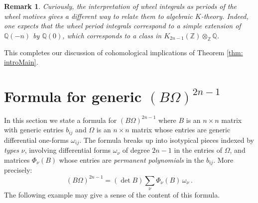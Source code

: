 \documentclass[10pt]{amsart}
\newcommand{\QQ}{{\mathbb Q}}
\newcommand{\ZZ}{{\mathbb Z}}
\theoremstyle{plain}
\newtheorem{remark}[thm]{Remark}
\newcommand{\0}{\color{blue}{\mathsf{0}}}
\begin{document}
\begin{remark}
Curiously, the  interpretation of wheel integrals as periods of the wheel motives gives a different  way to relate them to algebraic  $K$-theory. Indeed, one expects that the wheel period integrals correspond to a simple  extension  of $\QQ(-n)$ by $\QQ(0)$, which corresponds to a class in $K_{2n-1}(\ZZ)\otimes_{\ZZ} \QQ$.
\end{remark}

This completes our discussion of cohomological implications of Theorem \ref{thm: introMain}.


\section{Formula for  generic  \texorpdfstring{$(B\Omega)^{2n-1}$}{matrices}} \label{sec: 3}
In this section we state a formula for $(B\Omega)^{2n-1}$ where $B$ is an $n\times n$ matrix with generic entries  $b_{ij}$ and $\Omega$ is an $n\times n$ matrix whose entries are generic differential one-forms $\omega_{ij}.$ 
The formula breaks up into isotypical pieces indexed by \emph{types} $\nu$, involving differential  forms $\omega_{\nu}$ of degree $2n-1$ in the entries of $\Omega$, and matrices $\Phi_{\nu}(B)$ whose entries are \emph{permanent polynomials}  in the $b_{ij}$.
 More precisely: 
\[   (B\Omega)^{2n-1} = \left( \det B\right) \sum_{\nu} \Phi_{\nu}(B) \,\omega_\nu \ . \]
The  following example may give a sense of the content of this formula.
\end{document}

